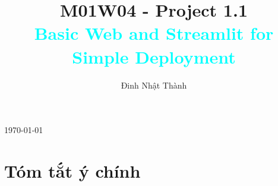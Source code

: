 \documentclass[11pt]{article}
\title{{M01W04 - Project 1.1}\\[0.5em]\textcolor{cyan}{Basic Web and Streamlit for Simple Deployment}}
\author{Đinh Nhật Thành}
\date{}
\renewcommand{\maketitle}{} %
\begin{document}
\maketitle

\begin{titlepage}
    \centering
    \vspace*{\fill}

    {\Huge \textbf{\thetitle} \par}
    \vspace{2em}

    {\Large \textbf{\theauthor} \par}
    \vspace{1em}

    {\large \today \par}

    \vspace*{\fill}
    \thispagestyle{fancy}
\end{titlepage}

\newpage
\tableofcontents
\thispagestyle{fancy}


\newpage

\renewcommand{\thesubsection}{\arabic{subsection}}
\newpage


\section{Tóm tắt ý chính}
\end{document}
